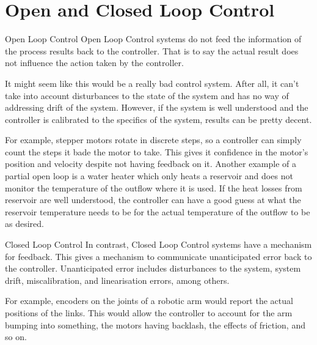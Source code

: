 \documentclass{../templates/topic}
\begin{document}
\chapter{Open and Closed Loop Control}

\begin{section}{Open Loop Control}
	Open Loop Control systems do not feed the information of the process results back to the controller. That is to say the actual result does not influence the action taken by the controller.
	
	It might seem like this would be a really bad control system. After all, it can't take into account disturbances to the state of the system and has no way of addressing drift of the system. However, if the system is well understood and the controller is calibrated to the specifics of the system, results can be pretty decent.
	
	For example, stepper motors rotate in discrete steps, so a controller can simply count the steps it bade the motor to take. This gives it confidence in the motor's position and velocity despite not having feedback on it. Another example of a partial open loop is a water heater which only heats a reservoir and does not monitor the temperature of the outflow where it is used. If the heat losses from reservoir are well understood, the controller can have a good guess at what the reservoir temperature needs to be for the actual temperature of the outflow to be as desired.
\end{section}

\begin{section}{Closed Loop Control}
	In contrast, Closed Loop Control systems have a mechanism for feedback. This gives a mechanism to communicate unanticipated error back to the controller. Unanticipated error includes disturbances to the system, system drift, miscalibration, and linearisation errors, among others.
	
	For example, encoders on the joints of a robotic arm would report the actual positions of the links. This would allow the controller to account for the arm bumping into something, the motors having backlash, the effects of friction, and so on.
\end{section}
\end{document}
